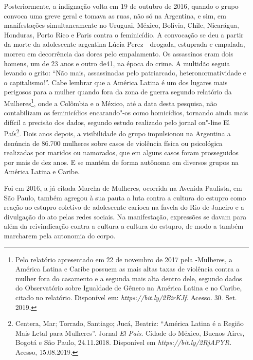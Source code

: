 Posteriormente, a indignação volta em 19 de outubro de 2016, quando o
grupo convoca uma greve geral e tomava as ruas, não só na Argentina, e
sim, em manifestações simultaneamente no Uruguai, México, Bolívia,
Chile, Nicarágua, Honduras, Porto Rico e Paris contra o feminicídio. A
convocação se deu a partir da morte da adolescente argentina Lúcia Perez
- drogada, estuprada e empalada, morreu em decorrência das dores pelo
empalamento. Os assassinos eram dois homens, um de 23 anos e outro de41,
na época do crime. A multidão seguia levando o grito: ``Não mais,
assassinadas pelo patriarcado, heteronormatividade e o capitalismo!''.
Cabe lembrar que a América Latina é um dos lugares mais perigosos para a
mulher quando fora da zona de guerra segundo relatório da 
Mulheres\footnote{Pelo relatório apresentado em 22 de novembro de 2017
  pela -Mulheres, a América Latina e Caribe possuem as mais altas
  taxas de violência contra a mulher fora do casamento e a segunda mais
  alta dentro dele, segundo dados do Observatório sobre Igualdade de
  Gênero na América Latina e no Caribe, citado no relatório. Disponível
  em:
  \emph{https://bit.ly/2BirKJf}.
  Acesso. 30. Set. 2019.}, onde a Colômbia e o México, até a data desta
pesquisa, não contabilizam os feminicídios encarando"-os como homicídios,
tornando ainda mais difícil a precisão dos dados, segundo estudo
realizado pelo jornal on"-line El País\footnote{Centera, Mar; Torrado,
  Santiago; Jucá, Beatriz: ``América Latina é a Região Mais Letal para
  Mulheres''. Jornal \emph{El País}. Cidade do México, Buenos Aires,
  Bogotá e São Paulo, 24.11.2018. Disponível em
  \emph{https://bit.ly/2RjAPYR}.
  Acesso, 15.08.2019.}. Dois anos depois, a visibilidade do grupo
impulsionou na Argentina a denúncia de 86.700 mulheres sobre casos de
violência física ou psicológica realizadas por maridos ou namorados, que
em alguns casos foram prosseguidos por mais de dez anos. E se mantém de
forma autônoma em diversos grupos na América Latina e Caribe.

Foi em 2016, a já citada Marcha de Mulheres, ocorrida na Avenida
Paulista, em São Paulo, também agregou à sua pauta a luta contra a
cultura do estupro como reação ao estupro coletivo de adolescente
carioca na favela do Rio de Janeiro e a divulgação do ato pelas redes
sociais. Na manifestação, expressões se davam para além da reivindicação
contra a cultura a cultura do estupro, de modo a também marcharem pela
autonomia do corpo.

